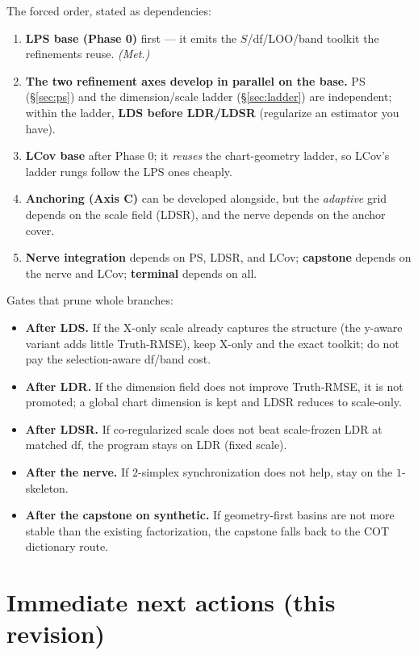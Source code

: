 \documentclass[11pt]{article}
\begin{document}
The forced order, stated as dependencies:
\begin{enumerate}[leftmargin=1.6em]
\item \textbf{LPS base (Phase 0)} first --- it emits the $S$/df/LOO/band toolkit the
refinements reuse. \emph{(Met.)}
\item \textbf{The two refinement axes develop in parallel on the base.} PS
(\S\ref{sec:ps}) and the dimension/scale ladder (\S\ref{sec:ladder}) are independent;
within the ladder, \textbf{LDS before LDR/LDSR} (regularize an estimator you have).
\item \textbf{LCov base} after Phase 0; it \emph{reuses} the chart-geometry ladder,
so LCov's ladder rungs follow the LPS ones cheaply.
\item \textbf{Anchoring (Axis C)} can be developed alongside, but the \emph{adaptive}
grid depends on the scale field (LDSR), and the nerve depends on the anchor cover.
\item \textbf{Nerve integration} depends on PS, LDSR, and LCov; \textbf{capstone}
depends on the nerve and LCov; \textbf{terminal} depends on all.
\end{enumerate}

\noindent Gates that prune whole branches:
\begin{itemize}[leftmargin=1.4em]
\item \textbf{After LDS.} If the X-only scale already captures the structure (the
y-aware variant adds little Truth-RMSE), keep X-only and the exact toolkit; do not
pay the selection-aware df/band cost.
\item \textbf{After LDR.} If the dimension field does not improve Truth-RMSE, it is
not promoted; a global chart dimension is kept and LDSR reduces to scale-only.
\item \textbf{After LDSR.} If co-regularized scale does not beat scale-frozen LDR at
matched df, the program stays on LDR (fixed scale).
\item \textbf{After the nerve.} If $2$-simplex synchronization does not help, stay on
the $1$-skeleton.
\item \textbf{After the capstone on synthetic.} If geometry-first basins are not more
stable than the existing factorization, the capstone falls back to the COT
dictionary route.
\end{itemize}

\section{Immediate next actions (this revision)}\label{sec:next}
\end{document}
